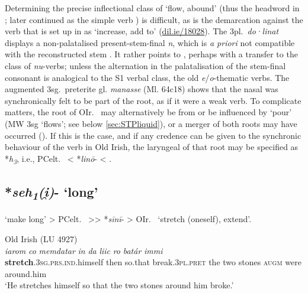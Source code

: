 \documentclass[output=paper,colorlinks,citecolor=brown]{langscibook}
\begin{document}
Determining the precise inflectional class of  ‘flow, abound’ (thus the headword in ; later continued as the simple verb ) is difficult, as is the demarcation against the verb that is set up in  as  ‘increase, add to’ (\href{https://dil.ie/18026}{dil.ie/18028}). The 3pl.\ \textit{do·linat} displays a non-palatalised present-stem-final \textit{n}, which is \textit{a priori} not compatible with the reconstructed stem . It rather points to , perhaps with a transfer to the class of \textit{nu}-verbs; unless the alternation in the palatalisation of the stem-final consonant is analogical to the S1 verbal class, the old \textit{e}/\textit{o}-thematic verbs. The augmented 3sg.\ preterite  gl. \textit{manasse} (Ml. 64c18) shows that the nasal was synchronically felt to be part of the root, as if it were a weak verb. To complicate matters, the root of OIr.\   may alternatively be from or be influenced by  ‘pour’ (MW 3sg  ‘flows’; see below \ref{sec:STPliquid}), or a merger of both roots may have occurred (\citealt[176--177]{Stifter2023}). If this is the case, and if any credence can be given to the synchronic behaviour of the verb in Old Irish, the laryngeal of that root may be specified as *\textit{h\textsubscript{3}}, i.e., PCelt.\  < *\textit{linō}- < .

\subsection{*\textit{seh\textsubscript{1}(i̯)}- ‘long’}
\label{sec:NIPlong}

 ‘make long’ > PCelt.\  >{>} *\textit{sīnī}- > OIr.\  ‘stretch (oneself), extend’.

\begin{exe}
    \ex Old Irish (LU 4927) \label{ex:NIPlong}\\
         \textit{iarom} \textit{co} \textit{memdatar} \textit{in} \textit{da} \textit{liic} \textit{ro} \textit{batár} \textit{immi}\\
        \textbf{stretch}.\textsc{3sg.prs.ind}.himself then so.that break.\textsc{3pl.pret} the two stones \textsc{augm} were around.him \\
        \glt ‘He stretches himself so that the two stones around him broke.’\\
\end{exe}
\end{document}
